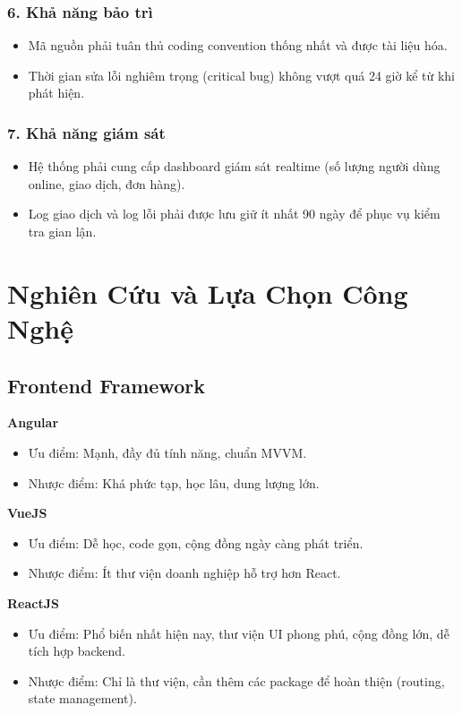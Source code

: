 \documentclass{article}
\begin{document}
\subsubsection*{6. Khả năng bảo trì}
\begin{itemize}
    \item Mã nguồn phải tuân thủ coding convention thống nhất và được tài liệu hóa.
    \item Thời gian sửa lỗi nghiêm trọng (critical bug) không vượt quá 24 giờ kể từ khi phát hiện.
\end{itemize}

\subsubsection*{7. Khả năng giám sát}
\begin{itemize}
    \item Hệ thống phải cung cấp dashboard giám sát realtime (số lượng người dùng online, giao dịch, đơn hàng).
    \item Log giao dịch và log lỗi phải được lưu giữ ít nhất 90 ngày để phục vụ kiểm tra gian lận.
    \
\end{itemize}
\section{Nghiên Cứu và Lựa Chọn Công Nghệ}

\subsection{Frontend Framework}

\textbf{Angular}
\begin{itemize}
    \item Ưu điểm: Mạnh, đầy đủ tính năng, chuẩn MVVM.
    \item Nhược điểm: Khá phức tạp, học lâu, dung lượng lớn.
\end{itemize}

\textbf{VueJS}
\begin{itemize}
    \item Ưu điểm: Dễ học, code gọn, cộng đồng ngày càng phát triển.
    \item Nhược điểm: Ít thư viện doanh nghiệp hỗ trợ hơn React.
\end{itemize}

\textbf{ReactJS}
\begin{itemize}
    \item Ưu điểm: Phổ biến nhất hiện nay, thư viện UI phong phú, cộng đồng lớn, dễ tích hợp backend.
    \item Nhược điểm: Chỉ là thư viện, cần thêm các package để hoàn thiện (routing, state management).
\end{itemize}
\end{document}
